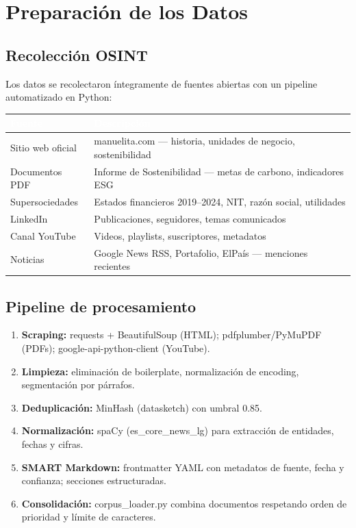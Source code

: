 \documentclass[12pt, a4paper]{article}
\newcommand{\THead}[1]{\cellcolor{hbg}\textcolor{white}{\sffamily\bfseries\small #1}}
\newcommand{\TA}{\rowcolor{g4}}
\newcommand{\tc}[1]{{\footnotesize\ttfamily #1}}
\begin{document}
\section{Preparación de los Datos}

\subsection{Recolección OSINT}

Los datos se recolectaron íntegramente de fuentes abiertas con un pipeline automatizado
en Python:

\begin{tabularx}{\linewidth}{F{3.8cm} L}
\toprule
\THead{Fuente} & \THead{Descripción} \\
\midrule
Sitio web oficial    & \tc{manuelita.com} — historia, unidades de negocio, sostenibilidad \\
\TA Documentos PDF   & Informe de Sostenibilidad — metas de carbono, indicadores ESG \\
Supersociedades      & Estados financieros 2019--2024, NIT, razón social, utilidades \\
\TA LinkedIn         & Publicaciones, seguidores, temas comunicados \\
Canal YouTube        & Videos, playlists, suscriptores, metadatos \\
\TA Noticias         & Google News RSS, Portafolio, ElPaís — menciones recientes \\
\bottomrule
\end{tabularx}

\vspace{6pt}

\subsection{Pipeline de procesamiento}

\begin{enumerate}
  \item \textbf{Scraping:} \tc{requests} + \tc{BeautifulSoup} (HTML);
        \tc{pdfplumber}/\tc{PyMuPDF} (PDFs); \tc{google-api-python-client} (YouTube).
  \item \textbf{Limpieza:} eliminación de boilerplate, normalización de encoding,
        segmentación por párrafos.
  \item \textbf{Deduplicación:} MinHash (\tc{datasketch}) con umbral 0.85.
  \item \textbf{Normalización:} \tc{spaCy} (\tc{es\_core\_news\_lg}) para extracción
        de entidades, fechas y cifras.
  \item \textbf{SMART Markdown:} frontmatter YAML con metadatos de fuente, fecha y
        confianza; secciones estructuradas.
  \item \textbf{Consolidación:} \tc{corpus\_loader.py} combina documentos respetando
        orden de prioridad y límite de caracteres.
\end{enumerate}
\end{document}
